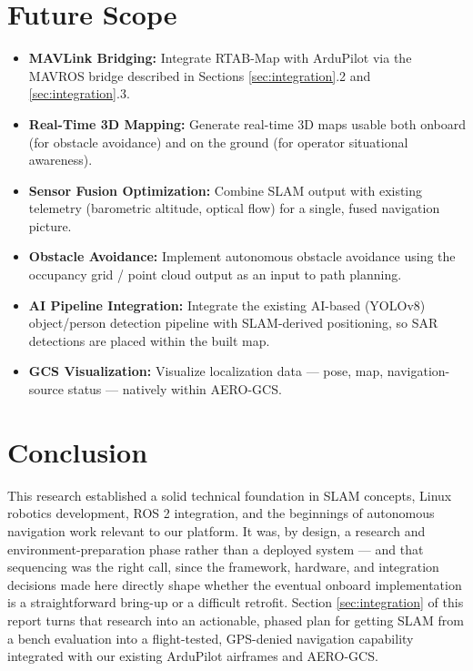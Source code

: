 \documentclass[11pt,a4paper]{article}
\begin{document}
\section{Future Scope}
\begin{itemize}
    \item \textbf{MAVLink Bridging:} Integrate RTAB-Map with ArduPilot via the MAVROS bridge described in Sections \ref{sec:integration}.2 and \ref{sec:integration}.3.
    \item \textbf{Real-Time 3D Mapping:} Generate real-time 3D maps usable both onboard (for obstacle avoidance) and on the ground (for operator situational awareness).
    \item \textbf{Sensor Fusion Optimization:} Combine SLAM output with existing telemetry (barometric altitude, optical flow) for a single, fused navigation picture.
    \item \textbf{Obstacle Avoidance:} Implement autonomous obstacle avoidance using the occupancy grid / point cloud output as an input to path planning.
    \item \textbf{AI Pipeline Integration:} Integrate the existing AI-based (YOLOv8) object/person detection pipeline with SLAM-derived positioning, so SAR detections are placed within the built map.
    \item \textbf{GCS Visualization:} Visualize localization data --- pose, map, navigation-source status --- natively within AERO-GCS.
\end{itemize}

\section{Conclusion}
This research established a solid technical foundation in SLAM concepts, Linux robotics development, ROS 2 integration, and the beginnings of autonomous navigation work relevant to our platform. It was, by design, a research and environment-preparation phase rather than a deployed system --- and that sequencing was the right call, since the framework, hardware, and integration decisions made here directly shape whether the eventual onboard implementation is a straightforward bring-up or a difficult retrofit. Section \ref{sec:integration} of this report turns that research into an actionable, phased plan for getting SLAM from a bench evaluation into a flight-tested, GPS-denied navigation capability integrated with our existing ArduPilot airframes and AERO-GCS.
\end{document}
